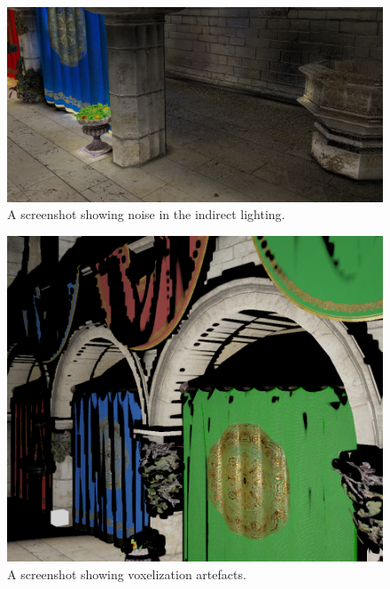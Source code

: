 \documentclass[]{acmsiggraph}
\begin{document}
\begin{figure}[htbp]\centering
 \includegraphics[width=1.0\linewidth]{images/indirect_noise.png}
 \caption{\label{fig:reference}A screenshot showing noise in the indirect lighting.}
\end{figure}

\begin{figure}[htbp]\centering
 \includegraphics[width=1.0\linewidth]{images/voxelization_error.png}
 \caption{\label{fig:reference}A screenshot showing voxelization artefacts.}
\end{figure}



\end{document}

